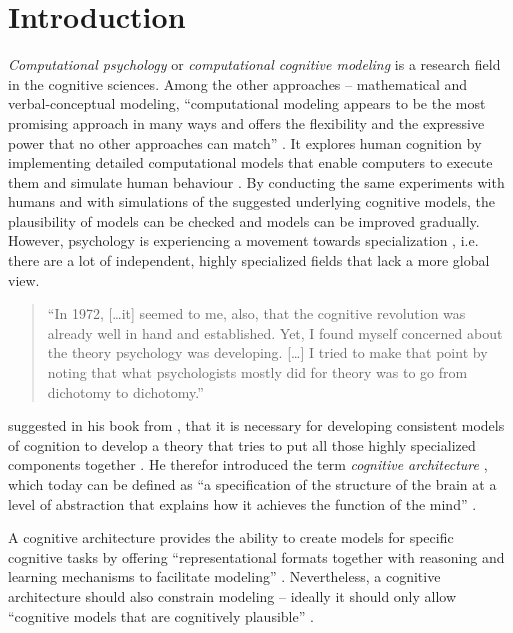 \chapter{Introduction}

\emph{Computational psychology} or \emph{computational cognitive modeling} is a research field in the cognitive sciences. Among the other approaches -- mathematical and verbal-conceptual modeling, ``computational modeling appears to be the most promising approach in many ways and offers the flexibility and the expressive power that no other approaches can match'' \cite[vii]{sun_introduction_2008}. It explores human cognition by implementing detailed computational models that enable computers to execute them and simulate human behaviour \cite[3]{sun_introduction_2008}. By conducting the same experiments with humans and with simulations of the suggested underlying cognitive models, the plausibility of models can be checked and models can be improved gradually. However, psychology is experiencing a movement towards specialization \cite{anderson_integrated_2004}, i.e. there are a lot of independent, highly specialized fields that lack a more global view.

\begin{quote}
``In 1972, [\dots it] seemed to me, also, that the cognitive revolution was already well in hand and established. Yet, I found myself concerned about the theory psychology was developing. [\dots] I tried to make that point by noting that what psychologists mostly did for theory was to go from dichotomy to dichotomy.'' \cite[1\psq]{newell_unified_1990}
\end{quote}

\citeauthor{newell_unified_1990} suggested in his book from \citeyear{newell_unified_1990} \cite{newell_unified_1990}, that it is necessary for developing consistent models of cognition to develop a theory that tries to put all those highly specialized components together \cite[1036]{anderson_integrated_2004}. He therefor introduced the term \emph{cognitive architecture} \cite[5]{anderson_how_2007}, which today can be defined as ``a specification of the structure of the brain at a level of abstraction that explains how it achieves the function of the mind'' \cite[7]{anderson_how_2007}.

A cognitive architecture provides the ability to create models for specific cognitive tasks \cite[29]{taatgen_modeling_2006} by offering ``representational formats together with reasoning and learning mechanisms to facilitate modeling'' \cite[29]{taatgen_modeling_2006}. Nevertheless, a cognitive architecture should also constrain modeling -- ideally it should only allow ``cognitive models that are cognitively plausible'' \cite[29]{taatgen_modeling_2006}.

